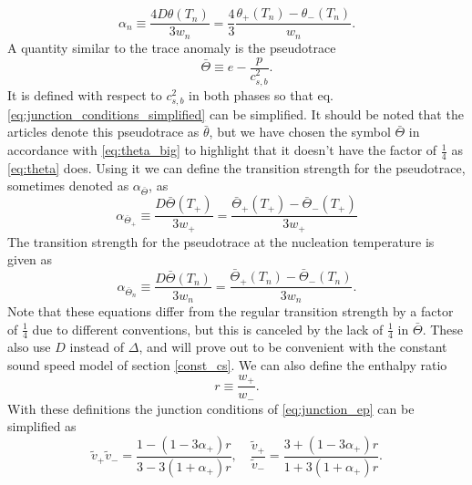 \cite[eq. 2.11]{hindmarsh_gw_pt_2019}
\begin{equation}
\alpha_n
\equiv \frac{4D\theta(T_n)}{3w_n}
= \frac{4}{3} \frac{\theta_+(T_n) - \theta_-(T_n)}{w_n}.
\label{eq:alpha_n}
\end{equation}
A quantity similar to the trace anomaly is the pseudotrace
\cites[eq. 34]{giese_2020}[eq. 1]{giese_2021}
\begin{equation}
\bar{\Theta} \equiv e - \frac{p}{c_{s,b}^2}.
\label{eq:theta_bar}
\end{equation}
It is defined with respect to $c_{s,b}^2$ in both phases so that eq. \ref{eq:junction_conditions_simplified} can be simplified.
It should be noted that the articles \cites{giese_2020}{giese_2021} denote this pseudotrace as $\bar{\theta}$,
but we have chosen the symbol $\bar{\Theta}$ in accordance with \eqref{eq:theta_big} to highlight that it doesn't have the factor of $\frac{1}{4}$ as \eqref{eq:theta} does.
Using it we can define the transition strength for the pseudotrace,
sometimes denoted as $\alpha_{\bar{\Theta}}$, as
\cites[eq. 34]{giese_2020}[eq. 1]{giese_2021}
\begin{equation}
\alpha_{\bar{\Theta}_+}
\equiv \frac{D \bar{\Theta}(T_+)}{3w_+}
= \frac{\bar{\Theta}_+(T_+) - \bar{\Theta}_-(T_+)}{3w_+}
\label{eq:alpha_theta_bar_plus}
\end{equation}
The transition strength for the pseudotrace at the nucleation temperature is given as
\begin{equation}
\alpha_{\bar{\Theta}_n}
\equiv \frac{D \bar{\Theta}(T_n)}{3w_n}
= \frac{\bar{\Theta}_+(T_n) - \bar{\Theta}_-(T_n)}{3w_n}.
\label{eq:alpha_theta_bar_n}
\end{equation}
Note that these equations differ from the regular transition strength by a factor of $\frac{1}{4}$ due to different conventions, but this is canceled by the lack of $\frac{1}{4}$ in $\bar{\Theta}$.
These also use $D$ instead of $\Delta$,
and will prove out to be convenient with the constant sound speed model of section \ref{const_cs}.
We can also define the enthalpy ratio
\begin{equation}
r \equiv \frac{w_+}{w_-}.
\end{equation}
With these definitions the junction conditions of \eqref{eq:junction_ep} can be simplified as
\begin{equation}
\tilde{v}_+ \tilde{v}_- = \frac{1-(1-3\alpha_+)r}{3-3(1+\alpha_+)r},
\quad
\frac{\tilde{v}_+}{\tilde{v}_-} = \frac{3+(1-3\alpha_+)r}{1+3(1+\alpha_+)r}.
\label{eq:junction_conditions_simplified}
\end{equation}
